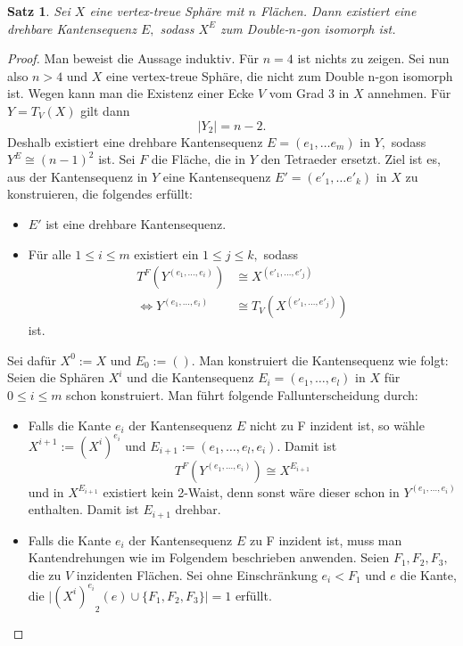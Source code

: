 \documentclass[12pt,titlepage,twoside,cleardoublepage]{article}
\theoremstyle{nummermitklammern}
\newtheorem{satz}[temp]{Satz}
\newtheorem{satz}[zahl]{Satz}
\numberwithin{equation}{section}
\begin{document}
\begin{satz}
Sei $X$ eine vertex-treue Sphäre mit $n$ Flächen. Dann existiert eine drehbare Kantensequenz $E,$ sodass $X^E$ zum Double-$n$-gon isomorph ist. 
\end{satz}
\begin{proof}
Man beweist die Aussage induktiv. Für $n=4$ ist nichts zu zeigen. Sei nun also $n>4$ und $X$ eine vertex-treue Sphäre, die nicht zum Double n-gon isomorph ist. 
Wegen  kann man die Existenz einer Ecke $V$ vom Grad 3 in $X$ annehmen. Für $Y=T_V(X)$ gilt dann 
\[
\vert Y_2\vert=n-2.
\]
Deshalb existiert eine drehbare Kantensequenz $E=(e_1,\ldots e_m)$ in $Y,$ sodass $Y^E\cong (n-1)^2$ ist. Sei $F$ die Fläche, die in $Y$ den Tetraeder ersetzt. Ziel ist es, aus der Kantensequenz in $Y$ eine Kantensequenz $E'=(e'_1,\ldots e'_k)$ in $X$ zu konstruieren, die folgendes erfüllt:
\begin{itemize}
\item $E'$ ist eine drehbare Kantensequenz.
\item Für alle $1\leq i\leq m$ existiert ein $1\leq j \leq k,$ sodass 
\begin{align*}
T^F(Y^{(e_1,\ldots, e_i)})&\cong X^{(e'_1,\ldots,e'_j)} \\
\Leftrightarrow Y^{(e_1,\ldots, e_i)}&\cong T_V(X^{(e'_1,\ldots,e'_j)})
\end{align*} 
ist. 
\end{itemize}
Sei dafür $X^0:=X$ und $E_0:=().$ Man konstruiert die Kantensequenz wie folgt: Seien die Sphären $X^i$ und die Kantensequenz $E_i=(e_1,\ldots,e_l)$ in $X$ für $0\leq i \leq m$ schon konstruiert. Man führt folgende Fallunterscheidung durch:
\begin{itemize}
\item Falls die Kante $e_i$ der Kantensequenz $E$ nicht zu F inzident ist, so wähle $X^{i+1}:={(X^i)}^{e_i}$ und $E_{i+1}:=(e_1,\ldots,e_l,e_i)$. Damit ist 
\[
T^F(Y^{(e_1,\ldots,e_i)})\cong X^{E_{i+1}}
\]
und in $X^{E_{i+1}}$ existiert kein 2-Waist, denn sonst wäre dieser schon in $Y^{(e_1,\ldots,e_i)}$ enthalten. Damit ist $E_{i+1}$ drehbar.
\item Falls die Kante $e_i$ der Kantensequenz $E$ zu F inzident ist, muss man Kantendrehungen wie im Folgendem beschrieben anwenden.
Seien $F_1,F_2,F_3,$ die zu $V$ inzidenten Flächen. Sei ohne Einschränkung $e_i<F_1$ und $e$ die Kante, die $\vert {(X^i)^{e_i}}_2(e)\cup \{F_1,F_2,F_3\}\vert =1$ erfüllt.
\begin{figure}[H]
\begin{center}

\end{center}
\end{figure}
\end{itemize}
\end{proof}
\end{document}
